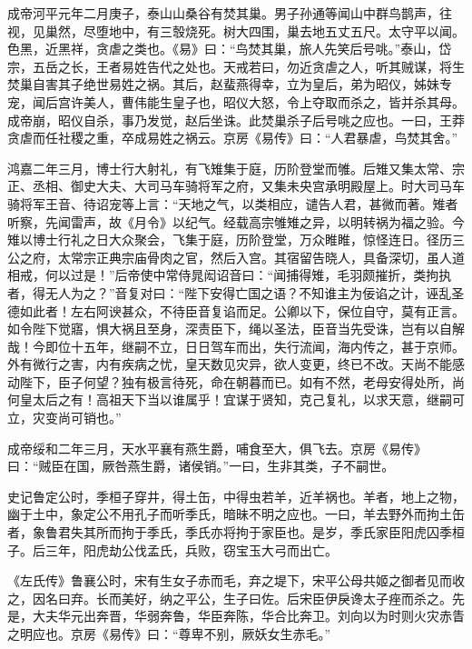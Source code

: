 \documentclass[12pt,UTF8]{ctexbook}
\begin{document}
成帝河平元年二月庚子，泰山山桑谷有焚其巢。男子孙通等闻山中群鸟鹊声，往视，见巢然，尽堕地中，有三彀烧死。树大四围，巢去地五丈五尺。太守平以闻。色黑，近黑祥，贪虐之类也。《易》曰：“鸟焚其巢，旅人先笑后号咷。”泰山，岱宗，五岳之长，王者易姓告代之处也。天戒若曰，勿近贪虐之人，听其贼谋，将生焚巢自害其子绝世易姓之祸。其后，赵蜚燕得幸，立为皇后，弟为昭仪，姊妹专宠，闻后宫许美人，曹伟能生皇子也，昭仪大怒，令上夺取而杀之，皆并杀其母。成帝崩，昭仪自杀，事乃发觉，赵后坐诛。此焚巢杀子后号咷之应也。一曰，王莽贪虐而任社稷之重，卒成易姓之祸云。京房《易传》曰：“人君暴虐，鸟焚其舍。”



鸿嘉二年三月，博士行大射礼，有飞雉集于庭，历阶登堂而雊。后雉又集太常、宗正、丞相、御史大夫、大司马车骑将军之府，又集未央宫承明殿屋上。时大司马车骑将军王音、待诏宠等上言：“天地之气，以类相应，谴告人君，甚微而著。雉者听察，先闻雷声，故《月令》以纪气。经载高宗雊雉之异，以明转祸为福之验。今雉以博士行礼之日大众聚会，飞集于庭，历阶登堂，万众睢睢，惊怪连日。径历三公之府，太常宗正典宗庙骨肉之官，然后入宫。其宿留告晓人，具备深切，虽人道相戒，何以过是！”后帝使中常侍晁闳诏音曰：“闻捕得雉，毛羽颇摧折，类拘执者，得无人为之？”音复对曰：“陛下安得亡国之语？不知谁主为佞谄之计，诬乱圣德如此者！左右阿谀甚众，不待臣音复谄而足。公卿以下，保位自守，莫有正言。如令陛下觉寤，惧大祸且至身，深责臣下，绳以圣法，臣音当先受诛，岂有以自解哉！今即位十五年，继嗣不立，日日驾车而出，失行流闻，海内传之，甚于京师。外有微行之害，内有疾病之忧，皇天数见灾异，欲人变更，终已不改。天尚不能感动陛下，臣子何望？独有极言待死，命在朝暮而已。如有不然，老母安得处所，尚何皇太后之有！高祖天下当以谁属乎！宜谋于贤知，克己复礼，以求天意，继嗣可立，灾变尚可销也。”



成帝绥和二年三月，天水平襄有燕生爵，哺食至大，俱飞去。京房《易传》曰：“贼臣在国，厥咎燕生爵，诸侯销。”一曰，生非其类，子不嗣世。



史记鲁定公时，季桓子穿井，得土缶，中得虫若羊，近羊祸也。羊者，地上之物，幽于土中，象定公不用孔子而听季氏，暗昧不明之应也。一曰，羊去野外而拘土缶者，象鲁君失其所而拘于季氏，季氏亦将拘于家臣也。是岁，季氏家臣阳虎囚季桓子。后三年，阳虎劫公伐孟氏，兵败，窃宝玉大弓而出亡。



《左氏传》鲁襄公时，宋有生女子赤而毛，弃之堤下，宋平公母共姬之御者见而收之，因名曰弃。长而美好，纳之平公，生子曰佐。后宋臣伊戾谗太子痤而杀之。先是，大夫华元出奔晋，华弱奔鲁，华臣奔陈，华合比奔卫。刘向以为时则火灾赤眚之明应也。京房《易传》曰：“尊卑不别，厥妖女生赤毛。”
\end{document}
